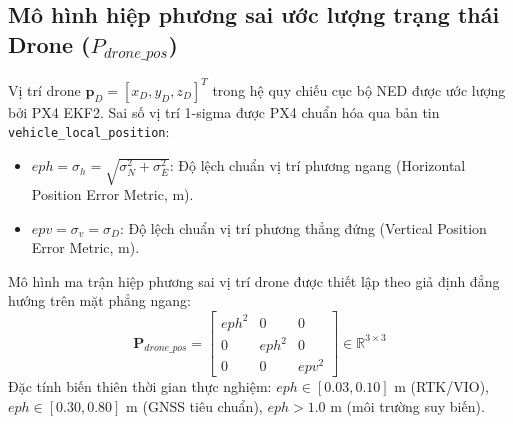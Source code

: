 \documentclass[12pt,a4paper]{article}
\begin{document}
\subsection{Mô hình hiệp phương sai ước lượng trạng thái Drone ($P_{drone\_pos}$)}
Vị trí drone $\mathbf{p}_D = [x_D, y_D, z_D]^T$ trong hệ quy chiếu cục bộ NED được ước lượng bởi PX4 EKF2. Sai số vị trí 1-sigma được PX4 chuẩn hóa qua bản tin \texttt{vehicle\_local\_position}:
\begin{itemize}[noitemsep,topsep=2pt]
    \item $eph = \sigma_h = \sqrt{\sigma_N^2 + \sigma_E^2}$: Độ lệch chuẩn vị trí phương ngang (Horizontal Position Error Metric, m).
    \item $epv = \sigma_v = \sigma_D$: Độ lệch chuẩn vị trí phương thẳng đứng (Vertical Position Error Metric, m).
\end{itemize}
Mô hình ma trận hiệp phương sai vị trí drone được thiết lập theo giả định đẳng hướng trên mặt phẳng ngang:
\begin{equation}
    \mathbf{P}_{drone\_pos} = \begin{bmatrix}
        eph^2 & 0 & 0 \\
        0 & eph^2 & 0 \\
        0 & 0 & epv^2
    \end{bmatrix} \in \mathbb{R}^{3 \times 3}
\end{equation}
Đặc tính biến thiên thời gian thực nghiệm: $eph \in [0.03, 0.10]\text{ m}$ (RTK/VIO), $eph \in [0.30, 0.80]\text{ m}$ (GNSS tiêu chuẩn), $eph > 1.0\text{ m}$ (môi trường suy biến).
\end{document}
